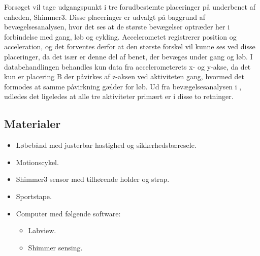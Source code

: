 
Forsøget vil tage udgangspunkt i tre forudbestemte placeringer på underbenet af enheden, Shimmer3. Disse placeringer er udvalgt på baggrund af bevægelsesanalysen, hvor det ses at de største bevægelser optræder her i forbindelse med gang, løb og cykling. Accelerometet registrerer position og acceleration, og det forventes derfor at den største forskel vil kunne ses ved disse placeringer, da det især er denne del af benet, der bevæges under gang og løb. I databehandlingen behandles kun data fra accelerometerets x- og y-akse, da det kun er placering B der påvirkes af z-aksen ved aktiviteten gang, hvormed det formodes at samme påvirkning gælder for løb\citep{RueterboriesSpaichLarsenEtAl2010}. Ud fra bevægelsesanalysen i , udledes det ligeledes at alle tre aktiviteter primært er i disse to retninger. 


 

\subsection{Materialer}
\begin{itemize}
	\item Løbebånd med justerbar hastighed og sikkerhedsbæresele.
	\item Motionscykel.
	\item Shimmer3 sensor med tilhørende holder og strap.
	\item Sportstape.
	\item Computer med følgende software:
	\begin{itemize}
		\item Labview.
		\item Shimmer sensing.
	\end{itemize}
\end{itemize}

